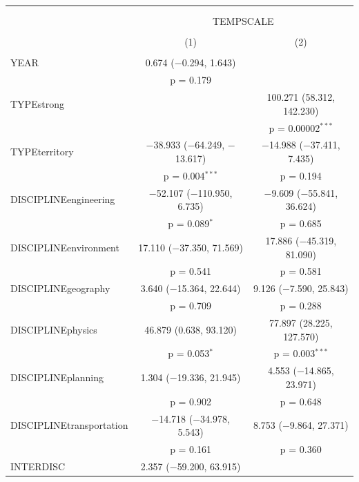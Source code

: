 \begin{table}%
\begin{tabular}{@{\extracolsep{5pt}}lcc} 
\\[-1.8ex]\hline 
\hline \\[-1.8ex] 
\\[-1.8ex] & \multicolumn{2}{c}{TEMPSCALE} \\ 
\\[-1.8ex] & (1) & (2)\\ 
\hline \\[-1.8ex] 
 YEAR & 0.674 ($-$0.294, 1.643) &  \\ 
  & p = 0.179 &  \\ 
  TYPEstrong &  & 100.271 (58.312, 142.230) \\ 
  &  & p = 0.00002$^{***}$ \\ 
  TYPEterritory & $-$38.933 ($-$64.249, $-$13.617) & $-$14.988 ($-$37.411, 7.435) \\ 
  & p = 0.004$^{***}$ & p = 0.194 \\ 
  DISCIPLINEengineering & $-$52.107 ($-$110.950, 6.735) & $-$9.609 ($-$55.841, 36.624) \\ 
  & p = 0.089$^{*}$ & p = 0.685 \\ 
  DISCIPLINEenvironment & 17.110 ($-$37.350, 71.569) & 17.886 ($-$45.319, 81.090) \\ 
  & p = 0.541 & p = 0.581 \\ 
  DISCIPLINEgeography & 3.640 ($-$15.364, 22.644) & 9.126 ($-$7.590, 25.843) \\ 
  & p = 0.709 & p = 0.288 \\ 
  DISCIPLINEphysics & 46.879 (0.638, 93.120) & 77.897 (28.225, 127.570) \\ 
  & p = 0.053$^{*}$ & p = 0.003$^{***}$ \\ 
  DISCIPLINEplanning & 1.304 ($-$19.336, 21.945) & 4.553 ($-$14.865, 23.971) \\ 
  & p = 0.902 & p = 0.648 \\ 
  DISCIPLINEtransportation & $-$14.718 ($-$34.978, 5.543) & 8.753 ($-$9.864, 27.371) \\ 
  & p = 0.161 & p = 0.360 \\ 
  INTERDISC & 2.357 ($-$59.200, 63.915) &  \\ 

\end{tabular}
\end{table}

